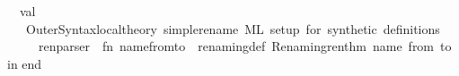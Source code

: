 \begin{isabellebody}
\isanewline
\ \ val\ {\isacharunderscore}{\kern0pt}\ {\isacharequal}{\kern0pt}\isanewline
\ \ \ Outer{\isacharunderscore}{\kern0pt}Syntax{\isachardot}{\kern0pt}local{\isacharunderscore}{\kern0pt}theory\ \isactrlcommandUNDERSCOREkeyword {\isasymopen}simple{\isacharunderscore}{\kern0pt}rename{\isasymclose}\ {\isachardoublequote}{\kern0pt}ML\ setup\ for\ synthetic\ definitions{\isachardoublequote}{\kern0pt}\isanewline
\ \ \ \ \ {\isacharparenleft}{\kern0pt}ren{\isacharunderscore}{\kern0pt}parser\ {\isachargreater}{\kern0pt}{\isachargreater}{\kern0pt}\ {\isacharparenleft}{\kern0pt}fn\ {\isacharparenleft}{\kern0pt}{\isacharparenleft}{\kern0pt}name{\isacharcomma}{\kern0pt}{\isacharparenleft}{\kern0pt}from{\isacharcomma}{\kern0pt}to{\isacharparenright}{\kern0pt}{\isacharparenright}{\kern0pt}{\isacharcomma}{\kern0pt}{\isacharunderscore}{\kern0pt}{\isacharparenright}{\kern0pt}\ {\isacharequal}{\kern0pt}{\isachargreater}{\kern0pt}\ renaming{\isacharunderscore}{\kern0pt}def\ Renaming{\isachardot}{\kern0pt}ren{\isacharunderscore}{\kern0pt}thm\ name\ from\ to\ {\isacharparenright}{\kern0pt}{\isacharparenright}{\kern0pt}\isanewline
\isanewline
in\isanewline
end\isanewline
{\isacartoucheclose}%
\endisatagML
{\isafoldML}%
%
\isadelimML
\isanewline
%
\endisadelimML
%
\isadelimtheory
%
\endisadelimtheory
%
\isatagtheory
{}\isamarkupfalse%
%
\endisatagtheory
{\isafoldtheory}%
%
\isadelimtheory
%
\endisadelimtheory
%
\end{isabellebody}%
\endinput
